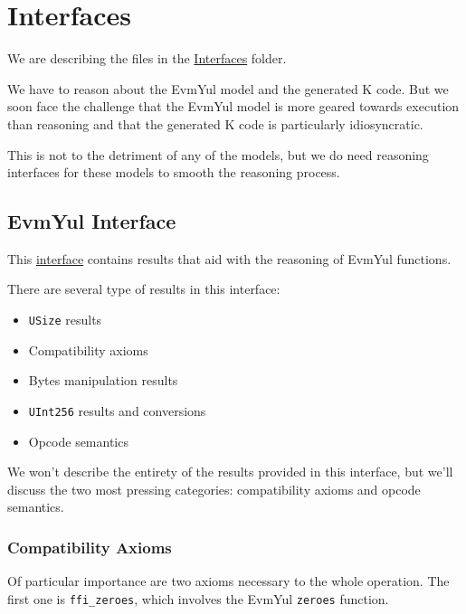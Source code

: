 \chapter{Interfaces}\label{chap:interfaces}

We are describing the files in the
\href{https://github.com/runtimeverification/evm-equivalence/tree/master/EvmEquivalence/Interfaces}{Interfaces}
folder.

We have to reason about the EvmYul model and the generated K code. But we soon
face the challenge that the EvmYul model is more geared towards execution than
reasoning and that the generated K code is particularly idiosyncratic.

This is not to the detriment of any of the models, but we do need reasoning
interfaces for these models to smooth the reasoning process.

\section{EvmYul Interface}

This
\href{https://github.com/runtimeverification/evm-equivalence/blob/master/EvmEquivalence/Interfaces/EvmYulInterface.lean}{interface}
contains results that aid with the reasoning of EvmYul functions.

There are several type of results in this interface:

\begin{itemize}
\item \texttt{USize} results
\item Compatibility axioms
\item Bytes manipulation results
\item \texttt{UInt256} results and conversions
\item Opcode semantics
\end{itemize}

We won't describe the entirety of the results provided in this interface, but
we'll discuss the two most pressing categories: compatibility axioms and opcode semantics.

\subsection{Compatibility Axioms}

Of particular importance are two axioms necessary to the whole operation. The
first one is \texttt{ffi_zeroes}, which involves the EvmYul \texttt{zeroes} function.

